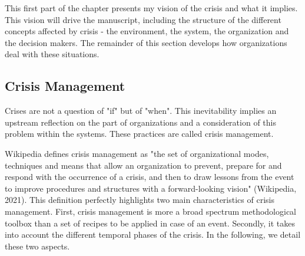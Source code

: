 This first part of the chapter presents my vision of the crisis and what it implies.
This vision will drive the manuscript, including the structure of the different concepts affected by crisis - the environment, the system, the organization and the decision makers.
The remainder of this section develops how organizations deal with these situations.

\subsection{Crisis Management}
Crises are not a question of "if" but of "when".
This inevitability implies an upstream reflection on the part of organizations and a consideration of this problem within the systems.
These practices are called crisis management.

Wikipedia defines crisis management as "the set of organizational modes, techniques and means that allow an organization to prevent,
prepare for and respond with the occurrence of a crisis, and then to draw lessons from the event to improve procedures and structures
with a forward-looking vision" (Wikipedia, 2021).
This definition perfectly highlights two main characteristics of crisis management.
First, crisis management is more a broad spectrum methodological toolbox than a set of recipes to be applied in case of an event.
Secondly, it takes into account the different temporal phases of the crisis.
In the following, we detail these two aspects.

